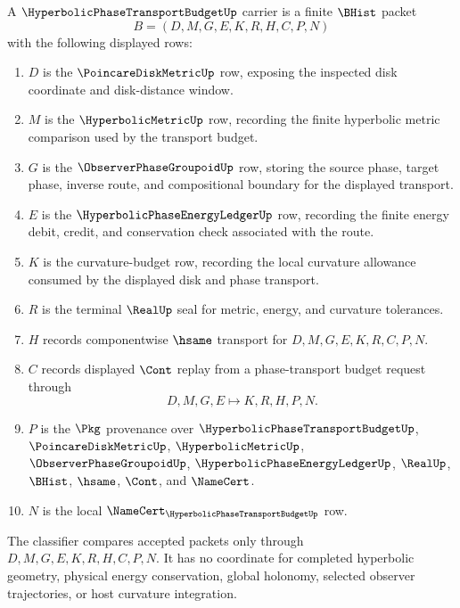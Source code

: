 \begin{definition}
\label{def:hyperbolic-phase-transport-budget-carrier}
A $\HyperbolicPhaseTransportBudgetUp$ carrier is a finite $\BHist$ packet
$$
B=(D,M,G,E,K,R,H,C,P,N)
$$
with the following displayed rows:
\begin{enumerate}
\item $D$ is the $\PoincareDiskMetricUp$ row, exposing the inspected disk coordinate and disk-distance window.
\item $M$ is the $\HyperbolicMetricUp$ row, recording the finite hyperbolic metric comparison used by the transport budget.
\item $G$ is the $\ObserverPhaseGroupoidUp$ row, storing the source phase, target phase, inverse route, and compositional boundary for the displayed transport.
\item $E$ is the $\HyperbolicPhaseEnergyLedgerUp$ row, recording the finite energy debit, credit, and conservation check associated with the route.
\item $K$ is the curvature-budget row, recording the local curvature allowance consumed by the displayed disk and phase transport.
\item $R$ is the terminal $\RealUp$ seal for metric, energy, and curvature tolerances.
\item $H$ records componentwise $\hsame$ transport for $D,M,G,E,K,R,C,P,N$.
\item $C$ records displayed $\Cont$ replay from a phase-transport budget request through
$$
D,M,G,E \longmapsto K,R,H,P,N .
$$
\item $P$ is the $\Pkg$ provenance over $\HyperbolicPhaseTransportBudgetUp$, $\PoincareDiskMetricUp$, $\HyperbolicMetricUp$, $\ObserverPhaseGroupoidUp$, $\HyperbolicPhaseEnergyLedgerUp$, $\RealUp$, $\BHist$, $\hsame$, $\Cont$, and $\NameCert$.
\item $N$ is the local $\NameCert_{\HyperbolicPhaseTransportBudgetUp}$ row.
\end{enumerate}
The classifier compares accepted packets only through $D,M,G,E,K,R,H,C,P,N$. It has no coordinate for completed hyperbolic geometry, physical energy conservation, global holonomy, selected observer trajectories, or host curvature integration.
\end{definition}

